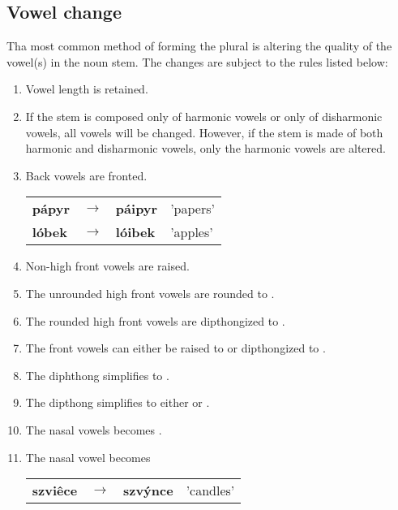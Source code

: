 \subsection{Vowel change}

\par Tha most common method of forming the plural is altering the quality of the vowel(s) in the noun stem. The changes are subject to the rules listed below:

\begin{enumerate}
	\item Vowel length is retained.
	\item If the stem is composed only of harmonic vowels or only of disharmonic vowels, all vowels will be changed. However, if the stem is made of both harmonic and disharmonic vowels, only the harmonic vowels are altered.
	\item Back vowels are fronted.
		\begin{table}[h!]
			\centering \small
			\begin{tabu}  to 0.8
				pápyr & $\rightarrow$ & páipyr & 'papers'\\
				lóbek & $\rightarrow$ & lóibek & 'apples'\\
				
			\end{tabu} 
		\end{table}
	\item Non-high front vowels are raised.
	\item The unrounded high front vowels  are rounded to .
	\item The rounded high front vowels  are dipthongized to .
	\item The front vowels  can either be raised to  or dipthongized to .
	\item The diphthong  simplifies to .
	\item The dipthong  simplifies to either  or \bt{\o:}.
	\item The nasal vowels  becomes .
	\item The nasal vowel  becomes 
			\begin{table}[h!]
		\centering \small
		\begin{tabu}  to 0.8
			szviêce & $\rightarrow$ & szvýnce & 'candles'\\	
		\end{tabu} 
	\end{table}
	
\end{enumerate}

